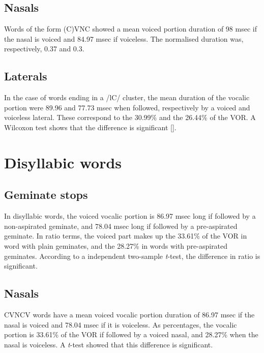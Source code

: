 \documentclass[11pt,a4paper,openany]{memoir}\usepackage[]{graphicx}\usepackage[]{color}
\begin{document}
\subsection{Nasals}



Words of the form (C)VNC showed a mean voiced portion duration of 98 msec if the nasal is voiced and 84.97 msec if voiceless.
The normalised duration was, respectively, 0.37 and 0.3.

\subsection{Laterals}



In the case of words ending in a /lC/ cluster, the mean duration of the vocalic portion were 89.96 and 77.73 msec when followed, respectively by a voiced and voiceless lateral.
These correspond to the 30.99\% and the 26.44\% of the VOR.
A Wilcoxon test shows that the difference is significant [].

\section{Disyllabic words}

\subsection{Geminate stops}




In disyllabic words, the voiced vocalic portion is 86.97 msec long if followed by a non-aspirated geminate, and 78.04 msec long if followed by a pre-aspirated geminate.
In ratio terms, the voiced part makes up the 33.61\% of the VOR in word with plain geminates, and the 28.27\% in words with pre-aspirated geminates.
According to a independent two-sample \textit{t}-test, the difference in ratio is significant.

\subsection{Nasals}




CVNCV words have a mean voiced vocalic portion duration of 86.97 msec if the nasal is voiced and 78.04 msec if it is voiceless.
As percentages, the vocalic portion is 33.61\% of the VOR if followed by a voiced nasal, and 28.27\% when the nasal is voiceless.
A \textit{t}-test showed that this difference is significant.
\end{document}
